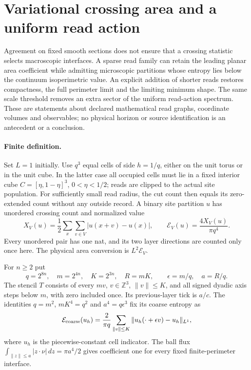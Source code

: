 \clearpage
\section{Variational crossing area and a uniform read action}
\label{sec:m1-interface-compactness}

Agreement on fixed smooth sections does not ensure that a crossing statistic
selects macroscopic interfaces. A sparse read family can retain the leading
planar area coefficient while admitting microscopic partitions whose entropy
lies below the continuum isoperimetric value. An explicit addition of shorter
reads restores compactness, the full perimeter limit and the limiting minimum
shape. The same scale threshold removes an extra sector of the uniform
read-action spectrum. These are statements about declared mathematical read
graphs, coordinate volumes and observables; no physical horizon or source
identification is an antecedent or a conclusion.

\paragraph{Finite definition.}
Set $L=1$ initially. Use $q^3$ equal cells of side $h=1/q$, either on the
unit torus or in the unit cube. In the latter case all occupied cells must
lie in a fixed interior cube $C=[\eta,1-\eta]^3$, $0<\eta<1/2$; reads are
clipped to the actual site population. For sufficiently small read radius,
the cut count then equals its zero-extended count without any outside record.
A binary site partition $u$ has unordered crossing count and normalized value
\[
 X_V(u)=\frac12\sum_x\sum_{v\in V}|u(x+v)-u(x)|,
 \qquad \mathcal E_V(u)=\frac{4X_V(u)}{\pi q^4}.
\]
Every unordered pair has one nat, and its two layer directions are counted
only once here. The physical area conversion is $L^2\mathcal E_V$.

For $n\ge2$ put
\[
 q=2^{8n},\quad m=2^{4n},\quad K=2^{3n},\quad R=mK,
 \qquad \epsilon=m/q,\quad a=R/q.
\]
The stencil $T$ consists of every $mv$, $v\in\mathbb Z^3$, $\|v\|\le K$,
and all signed dyadic axis steps below $m$, with zero included once. Its
previous-layer tick is $a/c$. The identities $q=m^2$, $mK^4=q^2$ and
$a^4=q\epsilon^3$ fix its coarse entropy as
\[
 \mathcal E_{\rm coarse}(u_h)
 =\frac{2}{\pi q}\sum_{\|v\|\le K}
       \|u_h(\cdot+\epsilon v)-u_h\|_{L^1},
\]
where $u_h$ is the piecewise-constant cell indicator. The ball flux
$\int_{\|z\|\le a}|z\cdot\nu|\,dz=\pi a^4/2$ gives coefficient one
for every fixed finite-perimeter interface.

